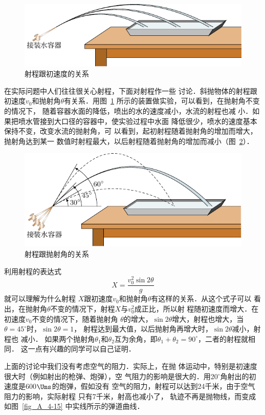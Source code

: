 \begin{figure}[htbp]
    \centering
    \includegraphics{fig/A/4-13.pdf}
    \caption{射程跟初速度的关系}\label{fig_A_4-13}
\end{figure}

    在实际问题中人们往往很关心射程，下面对射程作一些
讨论．斜抛物体的射程跟初速度$v_0$和抛射角$\theta$有关系．用图~\ref{fig_A_4-13} 所示的装置做实验，可以看到，在抛射角不变的情况下，
随着容器水面的降低，喷出的水的速度减小，水流的射程也减
小．如果把喷水管接到大口径的容器中，使实验过程中水面
降低很少，喷水的速度基本保持不变，改变水流的抛射角，可
以看到，起初射程随着抛射角的增加而增大，抛射角达到某一
数值时射程最大，以后射程随着抛射角的增加而减小（图~\ref{fig_A_4-14}）．

\begin{figure}[htbp]
    \centering
    \includegraphics{fig/A/4-14.pdf}
    \caption{射程跟抛射角的关系}\label{fig_A_4-14}
\end{figure}

利用射程的表达式
\[X=\frac{v_0^2\sin 2\theta}{g} \]
就可以理解为什么射程
$X$跟初速度$v_0$和抛射角$\theta$有这样的关系．从这个式子可以
看出，在抛射角$\theta$不变的情况下，射程$X$与$v^2_0$成正比，所以射
程随初速度而增大．在初速度$v_0$不变的情况下，随着抛射角
$\theta$的增大，$\sin 2\theta$增大，射程也增大，当$\theta=45^{\circ}$时，$\sin 2\theta=1$，
射程达到最大值，以后抛射角再增大时，$\sin 2\theta$减小，射程也
减小．
如果两个抛射角$\theta_1$和$\theta_2$互为余角，即$\theta_1+\theta_2=90^\circ$，二者的射程就相同．
这一点有兴趣的同学可以自己证明．

    上面的讨论中我们没有考虑空气的阻力．实际上，在抛
体运动中，特别是初速度很大时（例如射出的枪弹、炮弹），空
气阻力的影响是很大的．用20$^\circ$角射出的初速度是600$\Ums$的炮弹，假如没有 空气的阻力，射程可以达到24千米，由于空气阻力的影响，实际射程
只有7千米，射高也减小了，
轨迹不再是抛物线，而变成
如图~\ref{fig_A_4-15} 中实线所示的弹道曲线．

